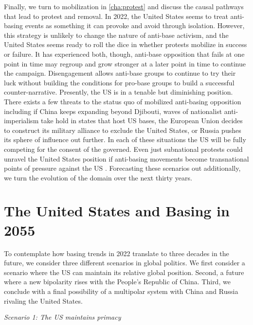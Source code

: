 Finally, we turn to mobilization in \ref{cha:protest} and discuss the causal pathways that lead to protest and removal. In 2022, the United States seems to treat anti-basing events as something it can provoke and avoid through isolation. However, this strategy is unlikely to change the nature of anti-base activism, and the United States seems ready to roll the dice in whether protests mobilize in success or failure. It has experienced both, though, anti-base opposition that fails at one point in time may regroup and grow stronger at a later point in time to continue the campaign. Disengagement allows anti-base groups to continue to try their luck without building the conditions for pro-base groups to build a successful counter-narrative. Presently, the US is in a tenable but diminishing position. There exists a few threats to the status quo of mobilized anti-basing opposition including if China keeps expanding beyond Djibouti, waves of nationalist anti-imperialism take hold in states that host US bases, the European Union decides to construct its military alliance to exclude the United States, or Russia pushes its sphere of influence out further. In each of these situations the US will be fully competing for the consent of the governed. Even just subnational protests could unravel the United States position if anti-basing movements become transnational points of pressure against the US \cite{Cooley2020}. Forecasting these scenarios out additionally, we turn the evolution of the domain over the next thirty years. 


\section*{The United States and Basing in 2055}

To contemplate how basing trends in 2022 translate to three decades in the future, we consider three different scenarios in global politics. We first consider a scenario where the US can maintain its relative global position. Second, a future where a new bipolarity rises with the People's Republic of China. Third, we conclude with a final possibility of a multipolar system with China and Russia rivaling the United States. 

\textit{Scenario 1: The US maintains primacy}

